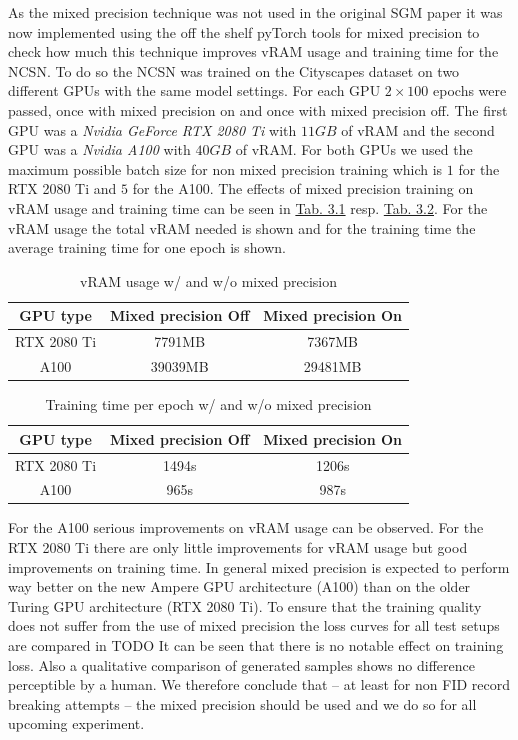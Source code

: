 As the mixed precision technique was not used in the original SGM paper \cite{score_3} it was now implemented using the off the shelf pyTorch tools for mixed precision to check how much this technique improves vRAM usage and training time for the NCSN. To do so the NCSN was trained on the Cityscapes dataset on two different GPUs with the same model settings. For each GPU $2\times100$ epochs were passed, once with mixed precision on and once with mixed precision off. The first GPU was a \textit{Nvidia GeForce RTX 2080 Ti} with $11GB$ of vRAM and the second GPU was a \textit{Nvidia A100} with $40GB$ of vRAM. For both GPUs we used the maximum possible batch size for non mixed precision training which is $1$ for the RTX 2080 Ti and $5$ for the A100. The effects of mixed precision training on vRAM usage and training time can be seen in \hyperref[tab:3.1]{Tab. 3.1} resp. \hyperref[tab:3.1]{Tab. 3.2}. For the vRAM usage the total vRAM needed is shown and for the training time the average training time for one epoch is shown.
%
\begin{table}[] \label{tab:3.1}
        \centering
    \begin{tabular}{c|c|c}
        GPU type        & Mixed precision \textbf{Off}    & Mixed precision \textbf{On} \\
        \hline
        RTX 2080 Ti     &  7791MB               & 7367MB\\
        A100            &  39039MB              & 29481MB
    \end{tabular}
    \caption{vRAM usage w/ and w/o mixed precision}
\end{table}
\begin{table}[b] \label{tab:3.2}
        \centering
    \begin{tabular}{c|c|c}
        GPU type        & Mixed precision \textbf{Off}    & Mixed precision \textbf{On} \\
        \hline
        RTX 2080 Ti     &  1494s                & 1206s    \\
        A100            &  965s                 & 987s
    \end{tabular}
    \caption{Training time per epoch w/ and w/o mixed precision}
\end{table}

For the A100 serious improvements on vRAM usage can be observed. For the RTX 2080 Ti there are only little improvements for vRAM usage but good improvements on training time. In general mixed precision is expected to perform way better on the new Ampere GPU
architecture (A100) than on the older Turing GPU architecture (RTX 2080 Ti). To ensure that the training quality does not suffer from the use of mixed precision the loss curves for all test setups are compared in TODO It can be seen that there is no notable effect on training loss. Also a qualitative comparison of generated samples shows no difference perceptible by a human. We therefore conclude that – at least for non FID record breaking attempts – the mixed precision should be used and we do so for all upcoming experiment.

